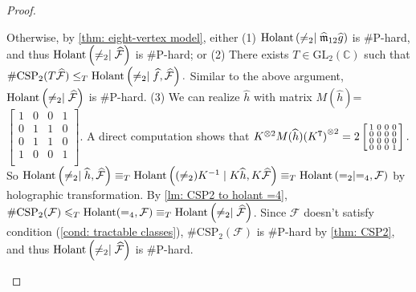 \begin{proof}
\begin{itemize}
    Otherwise, by \cref{thm: eight-vertex model}, either (1) $\operatorname{Holant}\left(\neq_2\mid \widehat{\mathfrak{m}}_{12}\widehat{g}\right)$ is \#P-hard, and thus $\operatorname{Holant}\left(\neq_2\mid \widehat{\mathcal{F}}\right)$ is \#P-hard;
    or (2) There exists $T\in\mathrm{GL}_2(\mathbb{C})$ such that $\#\mathrm{CSP}_2(T\widehat{\mathcal{F}})\le_T\operatorname{Holant}\left(\neq_2\mid \widehat{f},\widehat{\mathcal{F}}\right).$
    Similar to the above argument, $\operatorname{Holant}\left(\neq_2\mid \widehat{\mathcal{F}}\right)$ is \#P-hard.
    (3) We can realize $\widehat{h}$ with matrix $M(\widehat{h})$=$\left[\begin{smallmatrix}
        1 & 0 & 0 & 1\\
        0 & 1 & 1 & 0\\
        0 & 1 & 1 & 0\\
        1 & 0 & 0 & 1\\
    \end{smallmatrix}\right]$.
    A direct computation shows that $K^{\otimes 2}M(\widehat{h}){(K^{\tt T})}^{\otimes 2}=2\left[\begin{smallmatrix}
        1 & 0 & 0 & 0\\
        0 & 0 & 0 & 0\\
        0 & 0 & 0 & 0\\
        0 & 0 & 0 & 1\\
    \end{smallmatrix}\right].$
    So $\operatorname{Holant}\left(\neq_2\mid \widehat{h},\widehat{\mathcal{F}}\right)\equiv_T\operatorname{Holant}\left((\neq_2)K^{-1}\mid K\widehat{h},K\widehat{\mathcal{F}}\right)\equiv_T\operatorname{Holant}\left(=_2\mid =_4,\mathcal{F}\right)$ by holographic transformation.
    By \cref{lm: CSP2 to holant =4}, $\#\mathrm{CSP}_2(\mathcal{F})\leqslant_T\operatorname{Holant}(=_4, \mathcal F)\equiv_T\operatorname{Holant}\left(\neq_2\mid \widehat{\mathcal{F}}\right)$.
    Since $\mathcal{F}$ doesn't satisfy condition \rm{(\ref{cond: tractable classes})}, $\#\mathrm{CSP}_2(\mathcal{F})$ is \#P-hard by \cref{thm: CSP2}, and thus $\operatorname{Holant}\left(\neq_2\mid \widehat{\mathcal{F}}\right)$ is \#P-hard.
    

\end{itemize}
\end{proof}
